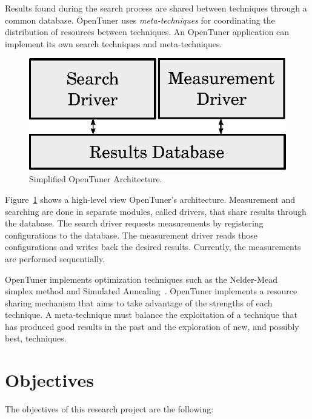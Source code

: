 \documentclass[a4paper, 12pt]{article}
\begin{document}
Results found during the search process are shared between techniques through a
common database. OpenTuner uses \emph{meta-techniques} for coordinating
the distribution of resources between techniques. An OpenTuner
application can implement its own search techniques and meta-techniques.

\begin{figure}[htpb]
    \centering
    \includegraphics[scale=.75]{opentuner-implementation}
    \caption{Simplified OpenTuner Architecture.}
    \label{fig:ot-imp}
\end{figure}

Figure~\ref{fig:ot-imp} shows a high-level view OpenTuner's architecture.
Measurement and searching are done in separate modules, called drivers,
that share results through the database. The search driver requests
measurements by registering configurations to the database. The measurement
driver reads those configurations and writes back the desired results.
Currently, the measurements are performed sequentially.

OpenTuner implements optimization techniques such as the
Nelder-Mead~\cite{nelder1965simplex} simplex
method and Simulated Annealing~\cite{kirkpatrick1983optimization}.
OpenTuner implements a resource sharing mechanism that aims to take
advantage of the strengths of each technique. A meta-technique
must balance the exploitation of a technique that has produced
good results in the past and the exploration of new, and possibly
best, techniques.

\section{Objectives} \label{sec:obj}

The objectives of this research project are the following:
\end{document}
